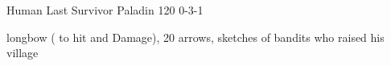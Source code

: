 \filledCS%
  {\currentName}%
  {Human}%
  {Last Survivor}%
  {Paladin}%
  {{1}{2}{0}}%
  {{0}{-3}{-1}}%
  {%
    \renewcommand\rank{Fodder}
    \renewcommand\characterDebt{100 \glspl{sp}}
    \setcounter{Cultivation}{2}
    \setcounter{Performance}{1}
    \setcounter{Stealth}{1}
    \setcounter{Brawl}{1}
    \setcounter{Projectiles}{1}
    \flail
    \addtocounter{equipmentWeight}{3}
  }%
  {\unstoppable}%
  {longbow ( to hit and Damage), 20 arrows, sketches of bandits who raised his \gls{village}}%


